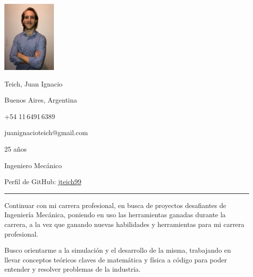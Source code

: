 \documentclass[a4paper,10pt]{article}
\newlength{\cvcolumngapwidth}
\newlength{\cvleftcolumnwidth}
\newlength{\cvrightcolumnwidth}
\newcommand{\cvnamestyle}[1]{{\Large\cvnamefont\textcolor{cvnamecolor}{#1}}}
\newcommand{\cvsectionstyle}[1]{{\normalsize\cvsectionfont\textcolor{cvsectioncolor}{#1}}}
\newcommand{\cvheadingstyle}[1]{{\normalsize\cvheadingfont\textcolor{cvheadingcolor}{#1}}}
\newlength{\cvafteritemskipamount}
\newlength{\cvaftersectionskipamount}
\newlength{\cvbetweensectionandheadingextraskipamount}
\newlength{\cvafternameskipamount}
\newlength{\cvafterpersonalinfolineskipamount}
\newlength{\cvparskip}
\newcommand{\cvpersonalinfo}[2]{
    \begin{minipage}[t]{\cvleftcolumnwidth}
        \vspace{0mm} %
        \raggedleft #1
    \end{minipage}%
    \hspace{\cvcolumngapwidth}%
    \begin{minipage}[t]{\cvrightcolumnwidth}
        \vspace{0mm} %
        #2
    \end{minipage}

    \vspace{\cvafteritemskipamount}
}
\newcommand{\cvname}[1]{
    \cvnamestyle{#1}

    \vspace{\cvafternameskipamount}
}
\newcommand{\cvpersonalinfolinewithicon}[3]{
    \raisebox{.5\fontcharht\font`E-.5\height}{\texttt{[image: \#2]}}
    #3

    \vspace{\cvafterpersonalinfolineskipamount}
}
\newcommand{\cvpersonalinfolinewithiconsvg}[3]{
    \raisebox{.5\fontcharht\font`E-.5\height}{}
    #3

    \vspace{\cvafterpersonalinfolineskipamount}
}
\newcommand{\cvsection}[1]{
    \begin{minipage}[t]{\cvleftcolumnwidth}
        \raggedleft\cvsectionstyle{#1}
    \end{minipage}%
    \hspace{\cvcolumngapwidth}%
    \begin{minipage}[t]{\cvrightcolumnwidth}
        \textcolor{cvrulecolor}{\rule{\cvrightcolumnwidth}{0.3mm}}
    \end{minipage}

    \vspace{\cvaftersectionskipamount}
}
\newcommand{\cvitem}[2]{
    \begin{minipage}[t]{\cvleftcolumnwidth}
        \raggedleft #1
    \end{minipage}%
    \hspace{\cvcolumngapwidth}%
    \begin{minipage}[t]{\cvrightcolumnwidth}
        \setlength{\parskip}{\cvparskip} #2
    \end{minipage}

    \vspace{\cvafteritemskipamount}
}
\begin{document}

\cvpersonalinfo{
    \includegraphics[height=36mm]{../logos-photos/photo.jpg}
}{
    \cvname{Teich, Juan Ignacio}

    \cvpersonalinfolinewithiconsvg{height=4mm}{../logos-photos/location-dot-solid.svg}{
       Buenos Aires, Argentina
    }

    \cvpersonalinfolinewithiconsvg{height=4mm}{../logos-photos/phone-solid.svg}{
        +54 11\,6491\,6389
    }

    \cvpersonalinfolinewithiconsvg{height=3mm}{../logos-photos/envelope-solid.svg}{
        juanignacioteich@gmail.com
    }


    \cvpersonalinfolinewithiconsvg{height=4mm}{../logos-photos/calendar-days-solid.svg}{
        25 años
    }

    \cvpersonalinfolinewithiconsvg{height=4mm}{../logos-photos/gear-solid.svg}{
        Ingeniero Mecánico 
    }

    \cvpersonalinfolinewithiconsvg{height=4mm}{../logos-photos/github-brands-solid.svg}{
        Perfil de GitHub: \href{https://github.com/jteich99}{jteich99}   
    }

}


\cvsection{OBJETIVOS PROFESIONALES}

\vspace{\cvbetweensectionandheadingextraskipamount}
\cvitem{\cvheadingstyle{}}{
    Continuar con mi carrera profesional, en busca de proyectos desafiantes de Ingeniería Mecánica, poniendo en uso las
    herramientas ganadas durante la carrera, a la vez que ganando nuevas habilidades y herramientas para mi carrera
    profesional.

    Busco orientarme a la simulación y el desarrollo de la misma, trabajando en llevar conceptos teóricos claves de
    matemática y física a código para poder entender y resolver problemas de la industria.
}
\end{document}
